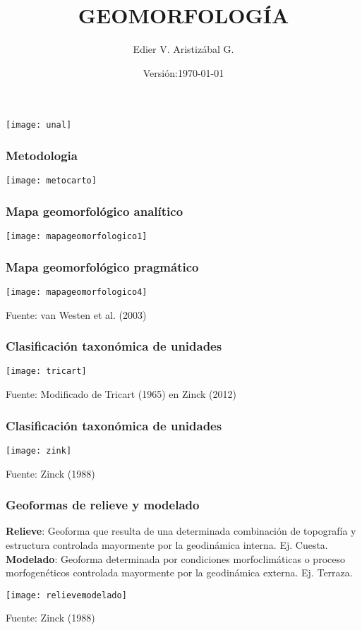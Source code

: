 \documentclass{beamer}
\title[Sistemas de Clasificación Geomorfológica]{GEOMORFOLOGÍA}
\author[Edier Aristizabal]{Edier V. Aristizábal G.}
\institute{evaristizabalg@unal.edu.co}
\date{\tiny{Versión:\today}}
\begin{document}
\begin{frame}
\titlepage
\centering
   	\texttt{[image: unal]} 
\end{frame}
\begin{frame}
\frametitle{Metodologia}
\begin{center}
   	\texttt{[image: metocarto]}
\end{center}
\end{frame}
\begin{frame}
\frametitle{Mapa geomorfológico analítico}
\begin{center}
   	\texttt{[image: mapageomorfologico1]}
\end{center}
\end{frame}
\begin{frame}
\frametitle{Mapa geomorfológico pragmático}
\begin{center}
   	\texttt{[image: mapageomorfologico4]}
\end{center}
\tiny{Fuente: van Westen et al. (2003)}
\end{frame}
\begin{frame}
\frametitle{Clasificación taxonómica de unidades}
\begin{center}
   	\texttt{[image: tricart]}
\end{center}
\tiny{Fuente: Modificado de Tricart (1965)  en Zinck (2012)}
\end{frame}
\begin{frame}
\frametitle{Clasificación taxonómica de unidades}
\begin{center}
   	\texttt{[image: zink]}
\end{center}
\tiny{Fuente: Zinck (1988)}
\end{frame}
\begin{frame}
\frametitle{Geoformas de relieve y modelado}
\small{
\textbf{Relieve}: Geoforma que resulta de una determinada combinación de topografía y estructura controlada mayormente por la geodinámica interna. Ej. Cuesta.\\
\textbf{Modelado}: Geoforma determinada por condiciones morfoclimáticas o proceso morfogenéticos controlada mayormente por la geodinámica externa. Ej. Terraza.
}
\begin{center}
   	\texttt{[image: relievemodelado]}
\end{center}
\tiny{Fuente: Zinck (1988)}
\end{frame}
\end{document}
